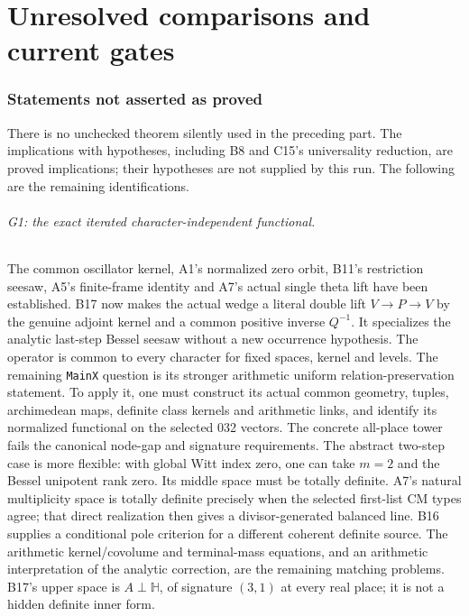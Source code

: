 \part{Unresolved comparisons and current gates}
\section{Statements not asserted as proved}

There is no unchecked theorem silently used in the preceding part.
The implications with hypotheses, including B8 and C15's universality
reduction, are proved implications; their hypotheses are not supplied
by this run. The following are the remaining identifications.

\paragraph{G1: the exact iterated character-independent functional.}
The common oscillator kernel, A1's normalized zero orbit, B11's
restriction seesaw, A5's finite-frame identity and A7's actual single
theta lift have been established. B17 now makes the actual wedge
a literal double lift $V\to P\to V$ by the genuine adjoint
kernel and a common positive inverse $Q^{-1}$.
It specializes the analytic last-step Bessel seesaw without a
new occurrence hypothesis. The operator is common to every
character for fixed spaces, kernel and levels.
The remaining \texttt{MainX} question is its stronger arithmetic
uniform relation-preservation statement. To apply it, one must
construct its actual common geometry,
tuples, archimedean maps, definite class kernels and arithmetic links,
and identify its normalized functional on the selected 032 vectors.
The concrete all-place tower fails the canonical node-gap and
signature requirements. The abstract two-step case is more flexible:
with global Witt index zero, one can take $m=2$ and the Bessel
unipotent rank zero. Its middle space must be totally definite.
A7's natural multiplicity space is totally definite precisely when
the selected first-list CM types agree; that direct realization then
gives a divisor-generated balanced line. B16 supplies a conditional
pole criterion for a different coherent definite source.
The arithmetic kernel/covolume and terminal-mass equations,
and an arithmetic interpretation of the analytic correction,
are the remaining matching problems. B17's upper space is
$A\perp\mathbb H$, of signature $(3,1)$ at every real place;
it is not a hidden definite inner form.

